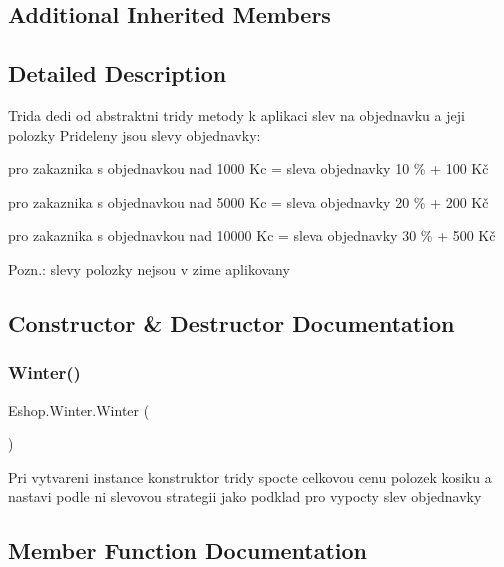 \subsection*{Additional Inherited Members}


\subsection{Detailed Description}
Trida dedi od abstraktni tridy metody k aplikaci slev na objednavku a jeji polozky Prideleny jsou slevy objednavky\+: 
\begin{DoxyItemize}
\item pro zakaznika s objednavkou nad 1000 Kc = sleva objednavky 10 \% + 100 Kč  
\item pro zakaznika s objednavkou nad 5000 Kc = sleva objednavky 20 \% + 200 Kč  
\item pro zakaznika s objednavkou nad 10000 Kc = sleva objednavky 30 \% + 500 Kč  
\end{DoxyItemize}Pozn.\+: slevy polozky nejsou v zime aplikovany 



\subsection{Constructor \& Destructor Documentation}
\mbox{\label{class_eshop_1_1_winter_a1fba448a83d80ce1cc8dc4d7e0da88e8}} 
\subsubsection{\texorpdfstring{Winter()}{Winter()}}
{\footnotesize\ttfamily Eshop.\+Winter.\+Winter (\begin{DoxyParamCaption}{ }\end{DoxyParamCaption})}



Pri vytvareni instance konstruktor tridy spocte celkovou cenu polozek kosiku a nastavi podle ni slevovou strategii jako podklad pro vypocty slev objednavky 



\subsection{Member Function Documentation}
\mbox{\label{class_eshop_1_1_winter_af4d2ccd9c970acc2d61ef67ef0ca8c9d}} 
